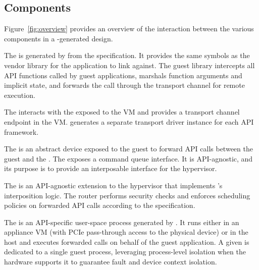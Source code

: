 \subsection{\Model Components}
\label{sub:components}
Figure~\ref{fig:overview} provides an overview of the interaction
between the various components in a \model-generated design.

The  is generated by \compiler from the \speclang
specification. It provides the same symbols as the vendor library for the
application to link against.
The guest library intercepts all API functions called by
guest applications, marshals function arguments and implicit
state, and forwards the call through the transport channel for
remote execution.

The  interacts with the \vdev exposed
to the VM and provides a transport channel endpoint in the VM.
\Compiler generates a separate transport driver instance for each API framework.

The \parname{\vdev}
is an abstract device exposed to the
guest to forward API calls
between the guest and the \worker.
The \vdev exposes %
a command queue interface.
It is API-agnostic, and its purpose is to
provide an interposable interface for the hypervisor.

The  is an API-agnostic extension to the hypervisor that
implements \model's interposition logic. The router performs security
checks and enforces scheduling policies on forwarded API calls according
to the \speclang specification.

The \parname{\worker} is an API-specific user-space process generated
by \compiler. It runs either in an appliance VM (with PCIe pass-through access to the physical device) or in the host
and executes forwarded calls on behalf of the guest application.
A given \Worker is dedicated to a single guest process, leveraging
process-level isolation when the hardware supports it to guarantee fault and device context isolation.

